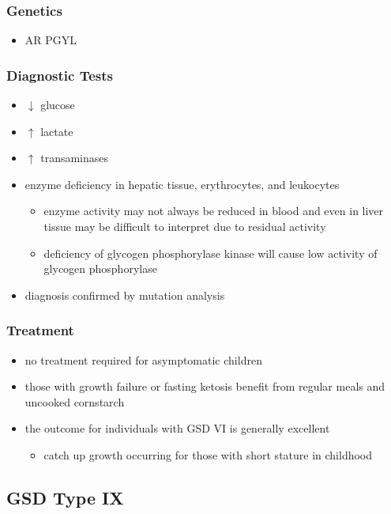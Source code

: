 \documentclass[12pt]{scrartcl}
\begin{document}
\subsubsection{Genetics}
\label{sec:orga594d47}
\begin{itemize}
\item AR PGYL
\end{itemize}
\subsubsection{Diagnostic Tests}
\label{sec:orga65d1a9}
\begin{itemize}
\item \(\downarrow\) glucose
\item \(\uparrow\) lactate
\item \(\uparrow\) transaminases
\item enzyme deficiency in hepatic tissue, erythrocytes, and leukocytes
\begin{itemize}
\item enzyme activity may not always be reduced in blood and even in liver
tissue may be difficult to interpret due to residual activity
\item deficiency of glycogen phosphorylase kinase will cause
low activity of glycogen phosphorylase
\end{itemize}
\item diagnosis confirmed by mutation analysis
\end{itemize}
\subsubsection{Treatment}
\label{sec:orgd4d6cd5}
\begin{itemize}
\item no treatment required for asymptomatic children
\item those with growth failure or fasting ketosis benefit from regular
meals and uncooked cornstarch
\item the outcome for individuals with GSD VI is generally excellent
\begin{itemize}
\item catch up growth occurring for those with short stature in childhood
\end{itemize}
\end{itemize}
\subsection{GSD Type IX}
\label{sec:org999760d}
\end{document}
